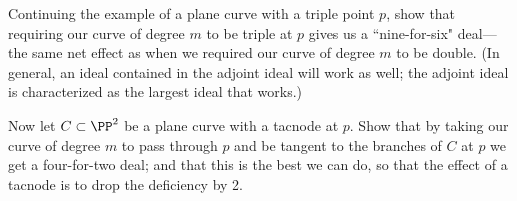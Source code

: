 \begin{exercise}
Continuing the example of a plane curve with a triple point $p$, show that requiring our curve of degree $m$ to be triple at $p$ gives us a ``nine-for-six" deal---the same net effect as when we required our curve of degree $m$ to be double. (In general, an ideal contained in the adjoint ideal will work as well; the adjoint ideal is characterized as the largest ideal that works.)
\end{exercise}

\begin{exercise}
Now let $C \subset \PP^2$ be a plane curve with a tacnode at $p$. Show that by taking our curve of degree $m$ to pass through $p$ and be tangent to the branches of $C$ at $p$ we get a four-for-two deal; and that this is the best we can do, so that the effect of a tacnode is to drop the deficiency by 2.
\end{exercise}



